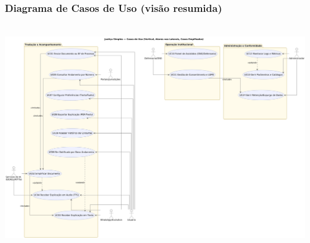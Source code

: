 \documentclass{article}
\begin{document}
\subsubsection{Diagrama de Casos de Uso (visão resumida)}
\includegraphics[width=1.25\textwidth,height=10cm,keepaspectratio]{images/488857090-49e54eee-2d6e-499b-9600-ad69237805b8.png}
\end{document}

